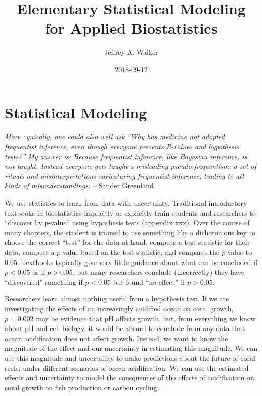 \documentclass[]{book}
\title{Elementary Statistical Modeling for Applied Biostatistics}
\author{Jeffrey A. Walker}
\date{2018-09-12}
\theoremstyle{definition}
\theoremstyle{definition}
\theoremstyle{definition}
\theoremstyle{remark}
\begin{document}
\maketitle

{
\setcounter{tocdepth}{1}
\tableofcontents
}
\chapter{Statistical Modeling}\label{statistical-modeling}

\emph{More cynically, one could also well ask ``Why has medicine not
adopted frequentist inference, even though everyone presents P-values
and hypothesis tests?'' My answer is: Because frequentist inference,
like Bayesian inference, is not taught. Instead everyone gets taught a
misleading pseudo-frequentism: a set of rituals and misinterpretations
caricaturing frequentist inference, leading to all kinds of
misunderstandings.} -- Sander Greenland

We use statistics to learn from data with uncertainty. Traditional
introductory textbooks in biostatistics implicitly or explicitly train
students and researchers to ``discover by p-value'' using hypothesis
tests (appendix xxx). Over the course of many chapters, the student is
trained to use something like a dichotomous key to choose the correct
``test'' for the data at hand, compute a test statistic for their data,
compute a \(p\)-value based on the test statistic, and compares the
\emph{p}-value to 0.05. Textbooks typically give very little guidance
about what can be concluded if \(p < 0.05\) or if \(p > 0.05\), but many
researchers conclude (incorrectly) they have ``discovered'' something if
\(p < 0.05\) but found ``no effect'' if \(p > 0.05\).

Researchers learn almost nothing useful from a hypothesis test. If we
are investigating the effects of an increasingly acidified ocean on
coral growth, \(p=0.002\) may be evidence that pH affects growth, but,
from everything we know about pH and cell biology, it would be absurd to
conclude from any data that ocean acidification does not affect growth.
Instead, we want to know the magnitude of the effect and our uncertainty
in estimating this magnitude. We can use this magnitude and uncertainty
to make predictions about the future of coral reefs, under different
scenarios of ocean acidification. We can use the estimated effects and
uncertainty to model the consquences of the effects of acidification on
coral growth on fish production or carbon cycling.
\end{document}
